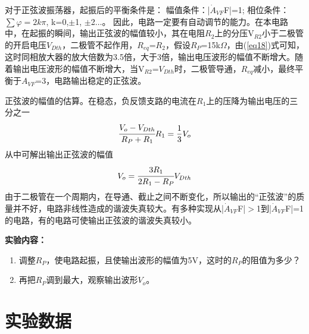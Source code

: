 \documentclass[a4paper]{article}
\begin{document}
对于正弦波振荡器，起振后的平衡条件是：
幅值条件：|$\dot{A}_{VF}$F|=1; 
相位条件：$\sum\varphi = 2k\pi$, k=0,$\pm$1, $\pm$2$\dots$。
因此，电路一定要有自动调节的能力。在本电路中，在起振的瞬间，输出正弦波的幅值较小，其在电阻$R_2$上的分压V$_{R2}$小于二极管的开启电压$V_{Dth}$，二极管不起作用，$R_{eq}$=$R_2$，假设$R_P$=15k$\Omega$，由(\ref{eq18})式可知，这时同相放大器的放大倍数为3.5倍，大于3倍，输出电压波形的幅值不断增大。随着输出电压波形的幅值不断增大，当V$_{R2}$=$V_{Dth}$时，二极管导通，$R_{eq}$减小，最终平衡于$A_{VF}$=3，电路输出稳定的正弦波。

正弦波的幅值的估算。在稳态，负反馈支路的电流在$R_1$上的压降为输出电压的三分之一
\begin{equation*}
\cfrac{V_o - V_{Dth}}{R_P+R_1}R_1 = \frac13V_o
\end{equation*}
从中可解出输出正弦波的幅值
\begin{equation*}
V_o = \cfrac{3R_1}{2R_1 - R_P}V_{Dth}
\end{equation*}
由于二极管在一个周期内，在导通、截止之间不断变化，所以输出的“正弦波”的质量并不好，电路非线性造成的谐波失真较大。有多种实现从|$\dot{A}_{VF}$F|$>$1到|$\dot{A}_{VF}$F|=1的电路，有的电路可使输出正弦波的谐波失真较小。

\textbf{实验内容：}
\begin{enumerate}
\item 调整$R_P$，使电路起振，且使输出波形的幅值为5V，这时的$R_P$的阻值为多少？
\item 再把$R_P$调到最大，观察输出波形$V_o$。
\end{enumerate}

\newpage
\section{实验数据}
\end{document}
